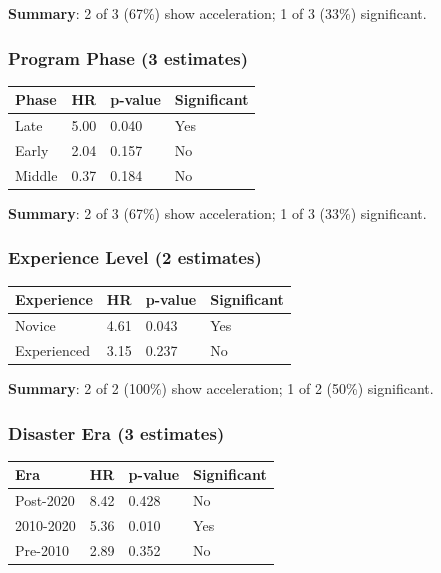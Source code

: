 \documentclass[
  12pt,
  letterpaper,
]{article}
\begin{document}
\textbf{Summary}: 2 of 3 (67\%) show acceleration; 1 of 3 (33\%)
significant.

\subsubsection{Program Phase (3
estimates)}\label{program-phase-3-estimates}

\begin{longtable}[]{@{}llll@{}}
\toprule\noalign{}
Phase & HR & p-value & Significant \\
\midrule\noalign{}
\endhead
\bottomrule\noalign{}
\endlastfoot
Late & 5.00 & 0.040 & Yes \\
Early & 2.04 & 0.157 & No \\
Middle & 0.37 & 0.184 & No \\
\end{longtable}

\textbf{Summary}: 2 of 3 (67\%) show acceleration; 1 of 3 (33\%)
significant.

\subsubsection{Experience Level (2
estimates)}\label{experience-level-2-estimates}

\begin{longtable}[]{@{}llll@{}}
\toprule\noalign{}
Experience & HR & p-value & Significant \\
\midrule\noalign{}
\endhead
\bottomrule\noalign{}
\endlastfoot
Novice & 4.61 & 0.043 & Yes \\
Experienced & 3.15 & 0.237 & No \\
\end{longtable}

\textbf{Summary}: 2 of 2 (100\%) show acceleration; 1 of 2 (50\%)
significant.

\subsubsection{Disaster Era (3
estimates)}\label{disaster-era-3-estimates}

\begin{longtable}[]{@{}llll@{}}
\toprule\noalign{}
Era & HR & p-value & Significant \\
\midrule\noalign{}
\endhead
\bottomrule\noalign{}
\endlastfoot
Post-2020 & 8.42 & 0.428 & No \\
2010-2020 & 5.36 & 0.010 & Yes \\
Pre-2010 & 2.89 & 0.352 & No \\
\end{longtable}
\end{document}
